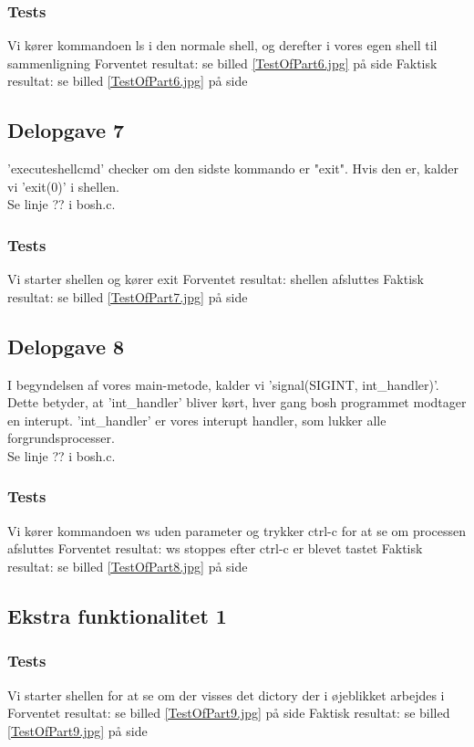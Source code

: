 \subsubsection{Tests}
Vi kører kommandoen ls i den normale shell, og derefter i vores egen shell til sammenligning
Forventet resultat: se billed \ref{TestOfPart6.jpg} på side \pageref{Test6}
Faktisk resultat: se billed \ref{TestOfPart6.jpg} på side \pageref{Test6} 

\subsection{Delopgave 7}
'executeshellcmd' checker om den sidste kommando er "exit". Hvis den er, kalder vi 'exit(0)' i shellen. 
\\Se linje ?? i bosh.c.
\subsubsection{Tests}
Vi starter shellen og kører exit
Forventet resultat: shellen afsluttes
Faktisk resultat: se billed \ref{TestOfPart7.jpg} på side \pageref{Test7}

\subsection{Delopgave 8}
I begyndelsen af vores main-metode, kalder vi 'signal(SIGINT, int\_handler)'. Dette betyder, at 'int\_handler' bliver kørt, hver gang bosh programmet modtager en interupt. 'int\_handler' er vores interupt handler, som lukker alle forgrundsprocesser. 
\\Se linje ?? i bosh.c.
\subsubsection{Tests}
Vi kører kommandoen ws uden parameter og trykker ctrl-c for at se om processen afsluttes
Forventet resultat: ws stoppes efter ctrl-c er blevet tastet
Faktisk resultat: se billed \ref{TestOfPart8.jpg} på side \pageref{Test8} 

\subsection{Ekstra funktionalitet 1}
\subsubsection{Tests}
Vi starter shellen for at se om der visses det dictory der i øjeblikket arbejdes i
Forventet resultat: se billed \ref{TestOfPart9.jpg} på side \pageref{Test9}
Faktisk resultat: se billed \ref{TestOfPart9.jpg} på side \pageref{Test9}


